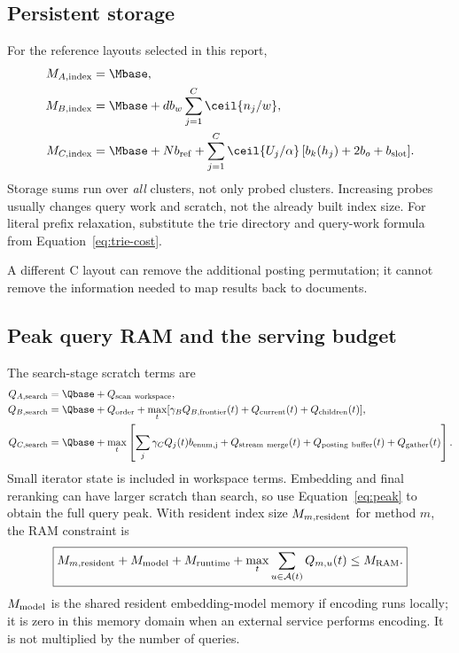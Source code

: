 \subsection{Persistent storage}
For the reference layouts selected in this report,
\begin{align}
M_{A,\rm index}&=\Mbase,\label{eq:final-storageA}\\
M_{B,\rm index}&=\Mbase+d b_w\sum_{j=1}^{C}\ceil{n_j/w},\label{eq:final-storageB}\\
M_{C,\rm index}&=\Mbase+N b_{\rm ref}
 +\sum_{j=1}^{C}\ceil{U_j/\alpha}\,[b_k(h_j)+2b_o+b_{\rm slot}].
\label{eq:final-storageC}
\end{align}
Storage sums run over \emph{all} clusters, not only probed clusters. Increasing probes usually
changes query work and scratch, not the already built index size. For literal prefix relaxation, substitute the trie directory and query-work formula from Equation~\eqref{eq:trie-cost}.

A different C layout can
remove the additional posting permutation; it cannot remove the information needed to map
results back to documents.

\subsection{Peak query RAM and the serving budget}

The search-stage scratch terms are
\begin{align}
Q_{A,\rm search}&=\Qbase+Q_{\rm scan\ workspace},\\
Q_{B,\rm search}&=\Qbase+Q_{\rm order}
 +\max_t[\gamma_B Q_{B,\rm frontier}(t)+Q_{\rm current}(t)+Q_{\rm children}(t)],\\
Q_{C,\rm search}&=\Qbase+
 \max_t\left[\sum_j\gamma_C Q_j(t)b_{\rm enum,j}
 +Q_{\rm stream\ merge}(t)+Q_{\rm posting\ buffer}(t)+Q_{\rm gather}(t)\right].
\end{align}
Small iterator state is included in workspace terms. Embedding and final reranking can have
larger scratch than search, so use Equation~\eqref{eq:peak} to obtain the full query peak.
With resident index size $M_{m,\rm resident}$ for method $m$, the RAM constraint is
\begin{equation}
\boxed{M_{m,\rm resident}+M_{\rm model}+M_{\rm runtime}
       +\max_t\sum_{u\in\mathcal A(t)}Q_{m,u}(t)\leq M_{\rm RAM}.}
\label{eq:final-ram}
\end{equation}
$M_{\rm model}$ is the shared resident embedding-model memory if encoding runs locally; it is zero in this memory domain when an external service performs encoding. It is not multiplied by the number of queries.

